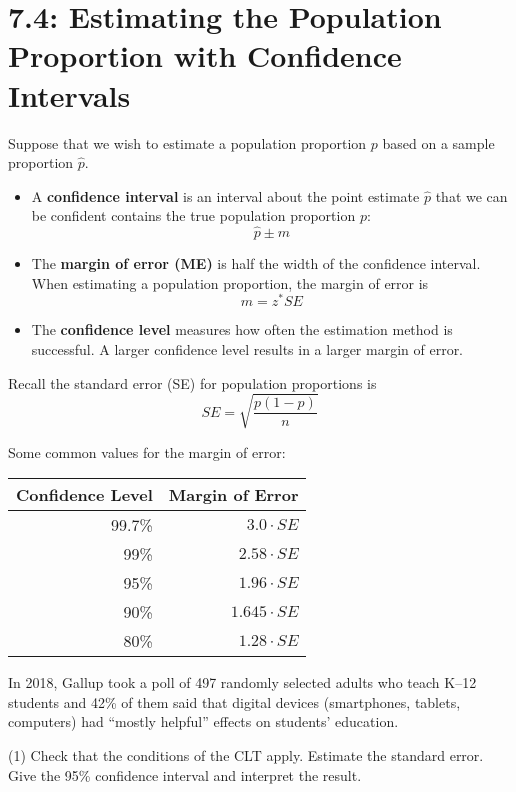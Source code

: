 \documentclass[../mathNotesPreamble]{subfiles}
\begin{document}
  \section{7.4: Estimating the Population Proportion with Confidence Intervals}
    \begin{defn*}
      Suppose that we wish to estimate a population proportion $p$ based on a sample proportion $\hat{p}$.
      \begin{itemize}
        \item A \textbf{confidence interval} is an interval about the point estimate $\hat{p}$ that we can be confident contains the true population proportion $p$:
          \[\hat{p}\pm m\]
        \item The \textbf{margin of error (ME)} is half the width of the confidence interval. When estimating a population proportion, the margin of error is
          \[m=z^* SE\]
        \item The \textbf{confidence level} measures how often the estimation method is successful. A larger confidence level results in a larger margin of error.
      \end{itemize}
    \end{defn*}

    Recall the standard error (SE) for population proportions is
      \[SE=\sqrt{\frac{p(1-p)}{n}}\]

    \noindent
    Some common values for the margin of error:
    \begin{center}
      \begin{tabular}{@{}rr@{}}\toprule
        Confidence Level& Margin of Error\\\midrule
        99.7\%& $3.0\cdot SE$\\
        99\%& $2.58\cdot SE$\\
        95\%& $1.96\cdot SE$\\
        90\%& $1.645\cdot SE$\\
        80\%& $1.28\cdot SE$\\\bottomrule
      \end{tabular}
    \end{center}
    \pagebreak

    \begin{ex*}
      In 2018, Gallup took a poll of 497 randomly selected adults who teach K--12 students and 42\% of them said that digital devices (smartphones, tablets, computers) had ``mostly helpful'' effects on students' education.
    \end{ex*}
    \begin{extasks}[after-item-skip=\stretch{1}](1)
      \task Check that the conditions of the CLT apply.
      \task Estimate the standard error.
      \task Give the 95\% confidence interval and interpret the result.
    \end{extasks}
    \pagebreak
\end{document}
